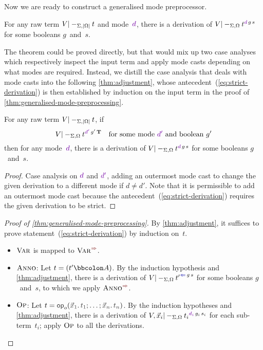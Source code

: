 Now we are ready to construct a generalised mode preprocessor.

\begin{theorem}\label{thm:generalised-mode-preprocessing}
For any raw term $V |-_{\Sigma,\left|\Omega\right|} t$ and mode~$\dir{d}$, there is a derivation of\/ $V |-_{\Sigma,\Omega} t^{\dir{d}\,g\,s}$ for some booleans $g$~and~$s$.
\end{theorem}

The theorem could be proved directly, but that would mix up two case analyses which respectively inspect the input term and apply mode casts depending on what modes are required.
Instead, we distill the case analysis that deals with mode casts into the following \cref{thm:adjustment}, whose antecedent~(\ref{eq:strict-derivation}) is then established by induction on the input term in the proof of \cref{thm:generalised-mode-preprocessing}.

\begin{lemma}\label{thm:adjustment}
For any raw term $V |-_{\Sigma,\left|\Omega\right|} t$, if
\begin{equation}\label{eq:strict-derivation}
V |-_{\Sigma,\Omega} t^{\dir{d'}\,g'\,\True} \quad\text{for some mode~$\dir{d'}$ and boolean~$g'$}
\end{equation}
then for any mode~$\dir{d}$, there is a derivation of\/ $V |-_{\Sigma,\Omega} t^{\dir{d}\,g\,s}$ for some booleans $g$~and~$s$.
\end{lemma}

\begin{proof}
Case analysis on $\dir{d}$ and $\dir{d'}$, adding an outermost mode cast to change the given derivation to a different mode if $d \neq d'$.
Note that it is permissible to add an outermost mode cast because the antecedent~(\ref{eq:strict-derivation}) requires the given derivation to be strict.
\end{proof}



\begin{proof}[Proof of \cref{thm:generalised-mode-preprocessing}]
By \cref{thm:adjustment}, it suffices to prove statement~(\ref{eq:strict-derivation}) by induction on~$t$.

\begin{itemize}
\item $\textnormal{\textsc{Var}}$ is mapped to $\SynRule{Var}$.
\item $\textnormal{\textsc{Anno}}$:
Let $t = (t' \bbcolon A)$.
By the induction hypothesis and \cref{thm:adjustment}, there is a derivation of $V |-_{\Sigma,\Omega} {t'}^{\chk\,g\,s}$ for some booleans $g$~and~$s$, to which we apply $\SynRule{Anno}$.
\item $\textnormal{\textsc{Op}}$:
Let $t = \tmOpts$.
By the induction hypotheses and \cref{thm:adjustment}, there is a derivation of $V, \vec x_i |-_{\Sigma,\Omega} {t_i}^{\dir{d_i}\,g_i\,s_i}$ for each sub-term~$t_i$; apply $\textnormal{\textsc{Op}}$ to all the derivations.
\vspace{-\topsep-\baselineskip}
\end{itemize}
\end{proof}

